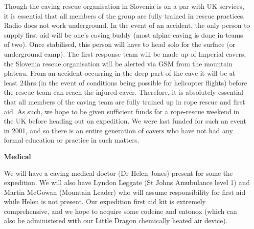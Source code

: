 Though the caving rescue organisation in Slovenia is on a par with UK services, it is essential that all members of the group are fully trained in rescue practices. Radio does not work underground. In the event of an accident, the only person to supply first aid will be one's caving buddy (most alpine caving is done in teams of two). Once stabilised, this person will have to head solo for the surface (or underground camp). The first response team will be made up of Imperial cavers, the Slovenia rescue organisation will be alerted via GSM from the mountain plateau. From an accident occurring in the deep part of the cave it will be at least 24hrs (in the event of conditions being possible for helicopter flights) before the rescue team can reach the injured caver. Therefore, it is absolutely essential that all members of the caving team are fully trained up in rope rescue and first aid. As such, we hope to be given sufficient funds for a rope-rescue weekend in the UK before heading out on expedition. We were last funded for such an event in 2001, and so there is an entire generation of cavers who have not had any formal education or practice in such matters.

\textbf{Medical}

We will have a caving medical doctor (Dr Helen Jones) present for some the expedition. We will also have Lyndon Leggate (St Johns Amubulance level 1) and Martin McGowan (Mountain Leader) who will assume responsibility for first aid while Helen is not present. Our expedition first aid kit is extremely comprehensive, and we hope to acquire some codeine and entonox (which can also be administered with our Little Dragon chemically heated air device).